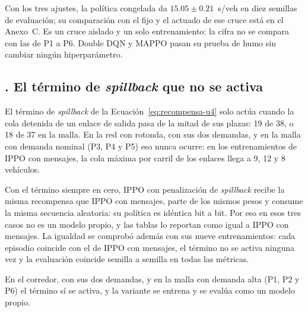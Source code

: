 Con los tres ajustes, la política congelada da $15.05 \pm 0.21$~s/veh
en diez semillas de evaluación; su comparación con el fijo y el actuado
de ese cruce está en el Anexo~C. Es un cruce aislado y un solo
entrenamiento: la cifra no se compara con las de P1 a P6. Double DQN y
MAPPO pasan su prueba de humo sin cambiar ningún hiperparámetro.

\subsection*{\theanexoIapartado. El término de \textit{spillback} que no se activa}
\label{sec:spill-vecinos}

El término de \textit{spillback} de la
Ecuación~\ref{eq:recompensa-u4} solo actúa cuando la cola detenida de
un enlace de salida pasa de la mitad de sus plazas: 19 de 38, o 18 de
37 en la malla. En la red con rotonda, con sus dos demandas, y en la
malla con demanda nominal (P3, P4 y P5) eso nunca ocurre: en los
entrenamientos de IPPO con mensajes, la cola máxima por carril de los
enlaces llega a 9, 12 y 8 vehículos.

Con el término siempre en cero, IPPO con penalización de
\textit{spillback} recibe la misma recompensa que IPPO con mensajes,
parte de los mismos pesos y consume la misma secuencia aleatoria: su
política es idéntica bit a bit. Por eso en esos tres casos no es un
modelo propio, y las tablas lo reportan como igual a IPPO con mensajes.
La igualdad se comprobó además con sus nueve entrenamientos: cada
episodio coincide con el de IPPO con mensajes, el término no se activa
ninguna vez y la evaluación coincide semilla a semilla en todas las
métricas.

En el corredor, con sus dos demandas, y en la malla con demanda alta
(P1, P2 y P6) el término sí se activa, y la variante se entrena y se
evalúa como un modelo propio.

